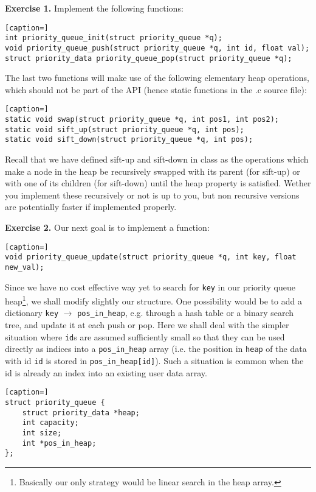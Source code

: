 \documentclass[a4paper,11pt]{article}
\begin{document}
{\bf Exercise 1.} Implement the following functions:
\begin{lstlisting}[caption=]
int priority_queue_init(struct priority_queue *q);
void priority_queue_push(struct priority_queue *q, int id, float val);
struct priority_data priority_queue_pop(struct priority_queue *q);
\end{lstlisting}
The last two functions will make use of the following elementary heap operations, which
should not be part of the API (hence static functions in the .c source file):
\begin{lstlisting}[caption=]
static void swap(struct priority_queue *q, int pos1, int pos2);
static void sift_up(struct priority_queue *q, int pos);
static void sift_down(struct priority_queue *q, int pos);
\end{lstlisting}
Recall that we have defined sift-up and sift-down in class as the operations which
make a node in the heap be recursively swapped with its parent (for sift-up) or with 
one of its children (for sift-down) until the heap property is satisfied. Wether you
implement these recursively or not is up to you, but non recursive versions are potentially
faster if implemented properly.

\bigskip

{\bf Exercise 2.} 
Our next goal is to implement a function:
\begin{lstlisting}[caption=]
void priority_queue_update(struct priority_queue *q, int key, float new_val);
\end{lstlisting}

Since we have no cost effective way yet to search for {\tt key} in our priority 
queue heap\footnote{Basically our only strategy would be linear search in the
heap array.}, we shall modify slightly our structure. One possibility would be 
to add a dictionary {\tt key} $\to$ {\tt pos\_in\_heap}, e.g. through a hash table 
or a binary search tree, and update it at each push or pop. Here we shall deal 
with the simpler situation where {\tt id}s are assumed sufficiently small so that 
they can be used directly as indices into a {\tt pos\_in\_heap} array (i.e. the 
position in {\tt heap} of the data with id {\tt id} is stored in {\tt pos\_in\_heap[id]}). 
Such a situation is common when the id is already an index into an existing user data array. 

\begin{lstlisting}[caption=]
struct priority_queue {
	struct priority_data *heap;
	int capacity;
	int size;
	int *pos_in_heap;
};
\end{lstlisting}
\end{document}
